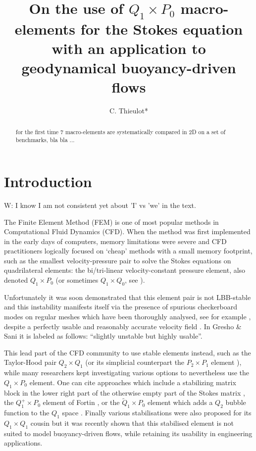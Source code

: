 \documentclass[a4paper,12pt]{article}
\title{
On the use of $Q_1\times P_0$ macro-elements for the Stokes equation with an application to 
geodynamical buoyancy-driven flows
}
\author{C. Thieulot*}
\begin{document}
\maketitle

\begin{abstract}
for the first time 7 macro-elements are systematically compared in 2D on a set of benchmarks,
bla bla ...
\end{abstract}


\section{Introduction} \label{sec1}

{\color{blue} W: I know I am not consistent yet about 'I' vs 'we' in the text.}


The Finite Element Method (FEM) is one of most popular methods in Computational Fluid Dynamics (CFD). 
When the method was first implemented 
in the early days of computers, memory limitations were severe and CFD practitioners logically 
focused on `cheap' methods with a small memory footprint, such as the smallest velocity-pressure pair to 
solve the Stokes equations on quadrilateral elements: the bi/tri-linear velocity-constant pressure element, 
also denoted $Q_1 \times P_0$ (or sometimes $Q_1\times Q_0$, see \cite{grsa}). 

Unfortunately it was soon demonstrated that this element pair is not LBB-stable \cite{boni84,boni85} 
and this instability
manifests itself via the presence of spurious checkerboard modes on regular meshes
which have been thoroughly analysed, see for example \cite{grsi94,chpc95,sagl81a,sagl81b}, 
despite a perfectly usable and reasonably accurate velocity field \cite{grsa,dohu03,bobf08,bobf13}.
In Gresho \& Sani \cite{grsa} it is labeled as follows: ``slightly unstable but highly usable''.

This lead part of the CFD community to use stable elements instead, 
such as the Taylor-Hood pair $Q_2\times Q_1$
(or its simplicial counterpart the $P_2\times P_1$ element \cite{thba25}), 
while many researchers kept investigating various options to nevertheless use the $Q_1\times P_0$ element.
One can cite approaches which include a stabilizing matrix block in the lower right part of 
the otherwise empty part of the Stokes matrix \cite{kesi88,sike90,vibo92,nosi98},
the $Q_1^+\times P_0$ element of Fortin \cite{fort81}, or the $\tilde{Q}_1\times P_0$ element which adds 
a $Q_2$ bubble function to the $Q_1$ space \cite[p265]{brfo}.
Finally various stabilisations were also proposed for its 
$Q_1\times Q_1$ cousin \cite{dobo04,bodg06,busa13} but it was recently shown\cite{thba22} 
that this stabilised element is not suited to model buoyancy-driven flows, 
while retaining its usability in engineering applications.  
\end{document}
